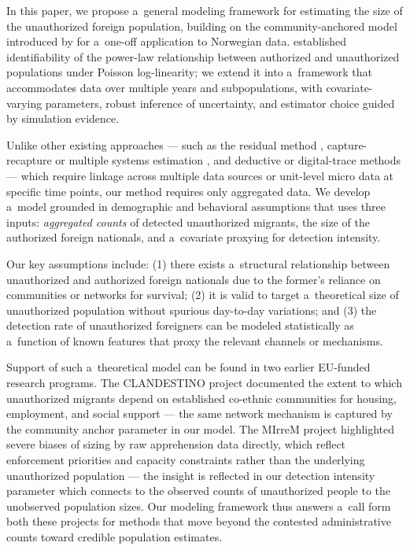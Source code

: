 In this paper, we propose a~general modeling framework for estimating the size of the unauthorized foreign population, building on the community-anchored model introduced by \citet{Zhang2008} for a~one-off application to Norwegian data. \citet{Zhang2008} established identifiability of the power-law relationship between authorized and unauthorized populations under Poisson log-linearity; we extend it into a~framework that accommodates data over multiple years and subpopulations, with covariate-varying parameters, robust inference of uncertainty, and estimator choice guided by simulation evidence. 

Unlike other existing approaches --- such as the residual method 
\citep[cf.][]{warren1987count, chassamboulli2015labor, van2021uncertainty, Warren2025},
capture-recapture or multiple systems estimation
\citep[cf.][]{chipperfield2024robust, bohning2024one, aleshin2024central},
and deductive or digital-trace methods \citep{recchi2026overstayers} --- which require linkage across multiple data sources or unit-level micro data at specific time points, our method requires only aggregated data. We develop a~model grounded in demographic and behavioral assumptions that uses three inputs: \emph{aggregated counts} of detected unauthorized migrants, the size of the authorized foreign nationals, and a~covariate proxying for detection intensity. 

Our key assumptions include: (1) there exists a~structural relationship between unauthorized and authorized foreign nationals due to the former's reliance on communities or networks for survival; (2) it is valid to target a~theoretical size of unauthorized population without spurious day-to-day variations; and (3) the detection rate of unauthorized foreigners can be modeled statistically as a~function of known features that proxy the relevant channels or mechanisms.

Support of such a~theoretical model can be found in two earlier EU-funded research programs. The CLANDESTINO project
\citep{CLANDESTINO2009} documented the extent to which unauthorized migrants depend on established co-ethnic communities for housing,
employment, and social support --- the same network mechanism is captured by the community anchor parameter in our model. The MIrreM project \citep{kierans2025handbook} highlighted severe biases of sizing by raw apprehension data directly, which reflect enforcement priorities and capacity constraints rather than the underlying unauthorized population --- the insight is reflected in our detection intensity parameter which connects to the observed counts of unauthorized people to the unobserved population sizes. Our modeling framework thus answers a~call form both these projects for methods that move beyond the contested administrative counts toward credible population estimates.
 
